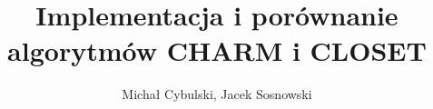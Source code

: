 \documentclass[12pt,oneside,a4paper]{article}
\begin{document}
\author{Michał Cybulski, Jacek Sosnowski}
\title{Implementacja i porównanie algorytmów CHARM i CLOSET}
\maketitle
%
\clearpage
\tableofcontents
\clearpage
{}





\clearpage

\end{document}
